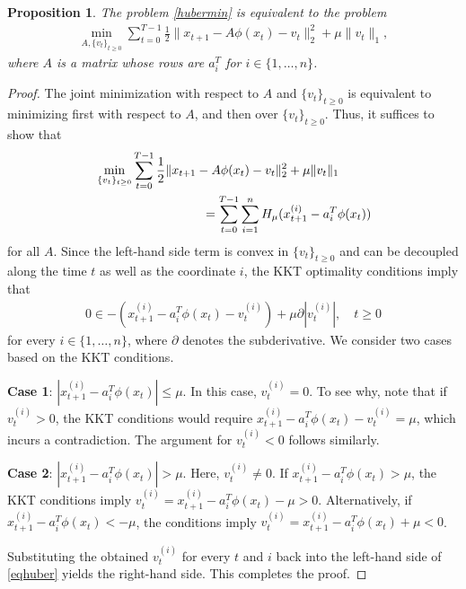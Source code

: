 \documentclass[letterpaper,10pt,conference]{ieeeconf}
\theoremstyle{plain} %
\newtheorem{proposition}{Proposition}
\theoremstyle{plain} %
\theoremstyle{plain} %
\theoremstyle{plain}
\begin{document}
\begin{proposition}
    The problem \eqref{hubermin} is equivalent to the problem 
    \begin{align}\label{lasso}
    \min_{A, \{v_t\}_{t\ge 0}} \sum_{t=0}^{T-1} \frac{1}{2}\|x_{t+1}  - A\phi(x_t)-v_t\|_2^2 + \mu \|v_t\|_1,
\end{align}
where $A$ is a matrix whose rows are $a_i^T$ for $i\in\{1,\dots,n\}$.
\end{proposition}

\begin{proof}
   The joint minimization with respect to $A$ and $\{v_t\}_{t\ge 0}$ is equivalent to  minimizing first with respect to $A$, and then over $\{v_t\}_{t\ge 0}$. Thus, it suffices to show that 
    \begin{equation}\label{eqhuber}
    \begin{split}
       & \min_{\{v_t\}_{t\ge 0}} \sum_{t=0}^{T-1} \frac{1}{2}\|x_{t+1}  - A\phi(x_t)-v_t\|_2^2 + \mu \|v_t\|_1 \\&\hspace{30mm}= \sum_{t=0}^{T-1} \sum_{i=1}^n H_{\mu} (x_{t+1}^{(i)} - a_i^T\phi(x_t))
       \end{split}
    \end{equation}
    for all $A$. Since the left-hand side term is convex in $\{v_t\}_{t\ge 0}$ and can be decoupled along the time $t$ as well as the coordinate $i$, the KKT optimality conditions imply that
    \begin{align*}
       0\in   -(x_{t+1}^{(i)} - a_i^T \phi(x_t)-v_t^{(i)}) + \mu \partial |v_t^{(i)}|, \quad t\ge 0
    \end{align*}
    for every $i\in\{1,\dots,n\}$, where $\partial$ denotes the subderivative.
We consider two cases based on the KKT conditions.

\textbf{Case 1}: $|x_{t+1}^{(i)} - a_i^T \phi(x_t)| \le \mu$. In this case, $v_t^{(i)} = 0$. To see why, note that if $v_t^{(i)} > 0$, the KKT conditions would require $x_{t+1}^{(i)} - a_i^T \phi(x_t) - v_t^{(i)} = \mu$, which incurs a contradiction. The argument for $v_t^{(i)} < 0$ follows similarly.

\textbf{Case 2}: $|x_{t+1}^{(i)} - a_i^T \phi(x_t)| > \mu$. Here, $v_t^{(i)} \ne 0$. If $x_{t+1}^{(i)} - a_i^T \phi(x_t) > \mu$, the KKT conditions imply $v_t^{(i)} = x_{t+1}^{(i)} - a_i^T \phi(x_t) - \mu>0$. Alternatively, if $x_{t+1}^{(i)} - a_i^T \phi(x_t) < -\mu$, the conditions imply $v_t^{(i)} = x_{t+1}^{(i)} - a_i^T \phi(x_t) + \mu<0$.
    
    
    
    
    Substituting the obtained $v_t^{(i)}$ for every $t$ and $i$ back into the left-hand side of \eqref{eqhuber} yields the right-hand side. This completes the proof.
\end{proof}
\end{document}
